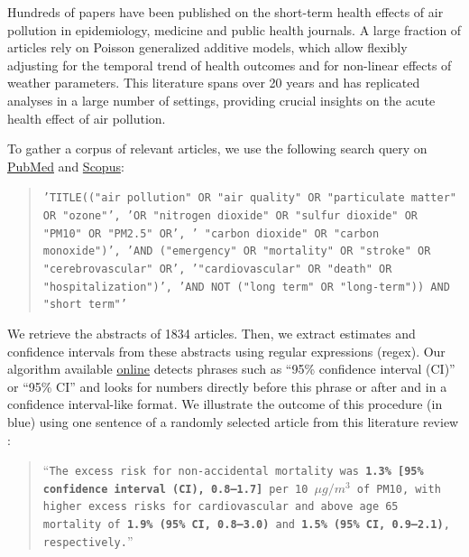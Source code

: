 \documentclass[12pt]{article}
\begin{document}
        Hundreds of papers have been published on the short-term health effects of air pollution in epidemiology, medicine and public health journals. A large fraction of articles rely on Poisson generalized additive models, which allow flexibly adjusting for the temporal trend of health outcomes and for non-linear effects of weather parameters. This literature spans over 20 years and has replicated analyses in a large number of settings, providing crucial insights on the acute health effect of air pollution. 
    
        To gather a corpus of relevant articles, we use the following search query on \href{https://www.ncbi.nlm.nih.gov/}{PubMed} and \href{https://www.scopus.com/home.uri}{Scopus}:
               
        \begin{quote}
       \footnotesize\texttt{'TITLE(("air pollution" OR "air quality" OR "particulate matter" OR "ozone"', 'OR "nitrogen dioxide" OR "sulfur dioxide" OR "PM10" OR "PM2.5" OR', ' "carbon dioxide" OR "carbon monoxide")',  'AND ("emergency" OR "mortality" OR "stroke" OR "cerebrovascular" OR', '"cardiovascular" OR "death" OR "hospitalization")', 'AND NOT ("long term" OR "long-term")) AND "short term"'}
        \end{quote}

       \noindent We retrieve the abstracts of 1834 articles. Then, we extract estimates and confidence intervals from these abstracts using regular expressions (regex). Our algorithm available \href{https://vincentbagilet.github.io/inference_pollution/automatic_lit_review_getting_abstracts.html}{online} detects phrases such as “95\% confidence interval (CI)” or “95\% CI” and looks for numbers directly before this phrase or after and in a confidence interval-like format. We illustrate the outcome of this procedure (in blue) using one sentence of a randomly selected article from this literature review \citep{vichit-vadakan_public_2008}:
        
\begin{sloppypar}
        \begin{quote}
         \footnotesize    “\texttt{The excess risk for non-accidental mortality was \textbf{\color{cerulean}1.3\% [95\% confidence interval (CI), 0.8–1.7]} per 10 $\mu g /m^3$ of PM10, with higher excess risks for cardiovascular and above age 65 mortality of \textbf{\color{cerulean}1.9\% (95\% CI, 0.8–3.0)} and \textbf{\color{cerulean}1.5\% (95\% CI, 0.9–2.1)}, respectively.}”
        \end{quote}
\end{sloppypar}
\end{document}
